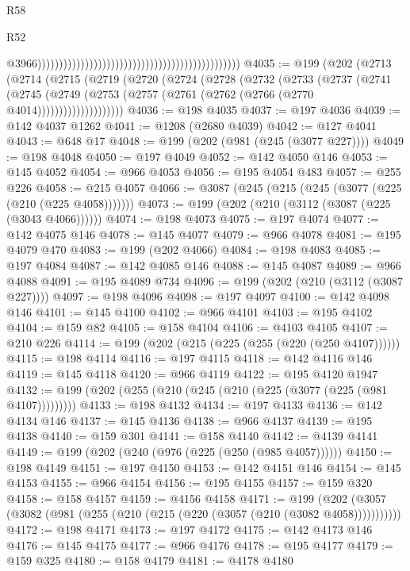 \begin{lexlean}{R58}
\begin{lexlean}{R52}
\begin{coremodule}
{{{{{{{{{{{{{{{{{{{{{{{{{{{{{{{{{{{{{{{{{{{{{{{{{{{{{{{{{{{{{{{{{{{{{{{{{{{{{{{{{{{{{{{{{{{{{{{{{{{{{{{{{{{{{{{{{{{{{{{{{{{{{{{{{{{{{{{{{{{{{{{{{{{{{{{{{{{{{{{{{{{{{{{{{{{{{{{{{{{{{{{{{{{{{{{{{{{{{{                                                                                                  @3966)))))))))))))))))))))))))))))))))))))))))))))))
@4035 := @199
    (@202
      (@2713
        (@2714
          (@2715
            (@2719
              (@2720
                (@2724
                  (@2728
                    (@2732
                      (@2733
                        (@2737
                          (@2741
                            (@2745
                              (@2749
                                (@2753 (@2757 (@2761 (@2762 (@2766 (@2770 @4014))))))))))))))))))))
@4036 := @198 @4035
@4037 := @197 @4036
@4039 := @142 @4037 @1262
@4041 := @1208 (@2680 @4039)
@4042 := @127 @4041
@4043 := @648 @17
@4048 := @199 (@202 (@981 (@245 (@3077 @227))))
@4049 := @198 @4048
@4050 := @197 @4049
@4052 := @142 @4050 @146
@4053 := @145 @4052
@4054 := @966 @4053
@4056 := @195 @4054 @483
@4057 := @255 @226
@4058 := @215 @4057
@4066 := @3087 (@245 (@215 (@245 (@3077 (@225 (@210 (@225 @4058)))))))
@4073 := @199 (@202 (@210 (@3112 (@3087 (@225 (@3043 @4066))))))
@4074 := @198 @4073
@4075 := @197 @4074
@4077 := @142 @4075 @146
@4078 := @145 @4077
@4079 := @966 @4078
@4081 := @195 @4079 @470
@4083 := @199 (@202 @4066)
@4084 := @198 @4083
@4085 := @197 @4084
@4087 := @142 @4085 @146
@4088 := @145 @4087
@4089 := @966 @4088
@4091 := @195 @4089 @734
@4096 := @199 (@202 (@210 (@3112 (@3087 @227))))
@4097 := @198 @4096
@4098 := @197 @4097
@4100 := @142 @4098 @146
@4101 := @145 @4100
@4102 := @966 @4101
@4103 := @195 @4102
@4104 := @159 @82
@4105 := @158 @4104
@4106 := @4103 @4105
@4107 := @210 @226
@4114 := @199 (@202 (@215 (@225 (@255 (@220 (@250 @4107))))))
@4115 := @198 @4114
@4116 := @197 @4115
@4118 := @142 @4116 @146
@4119 := @145 @4118
@4120 := @966 @4119
@4122 := @195 @4120 @1947
@4132 := @199 (@202 (@255 (@210 (@245 (@210 (@225 (@3077 (@225 (@981 @4107)))))))))
@4133 := @198 @4132
@4134 := @197 @4133
@4136 := @142 @4134 @146
@4137 := @145 @4136
@4138 := @966 @4137
@4139 := @195 @4138
@4140 := @159 @301
@4141 := @158 @4140
@4142 := @4139 @4141
@4149 := @199 (@202 (@240 (@976 (@225 (@250 (@985 @4057))))))
@4150 := @198 @4149
@4151 := @197 @4150
@4153 := @142 @4151 @146
@4154 := @145 @4153
@4155 := @966 @4154
@4156 := @195 @4155
@4157 := @159 @320
@4158 := @158 @4157
@4159 := @4156 @4158
@4171 := @199 (@202 (@3057 (@3082 (@981 (@255 (@210 (@215 (@220 (@3057 (@210 (@3082 @4058)))))))))))
@4172 := @198 @4171
@4173 := @197 @4172
@4175 := @142 @4173 @146
@4176 := @145 @4175
@4177 := @966 @4176
@4178 := @195 @4177
@4179 := @159 @325
@4180 := @158 @4179
@4181 := @4178 @4180
}}}}}}}}}}}}}}}}}}}}}}}}}}}}}}}}}}}}}}}}}}}}}}}}}}}}}}}}}}}}}}}}}}}}}}}}}}}}}}}}}}}}}}}}}}}}}}}}}}}}}}}}}}}}}}}}}}}}}}}}}}}}}}}}}}}}}}}}}}}}}}}}}}}}}}}}}}}}}}}}}}}}}}}}}}}}}}}}}}}}}}}}}}}}}}}}}}}}}}
\end{coremodule}
\end{lexlean}
\end{lexlean}
